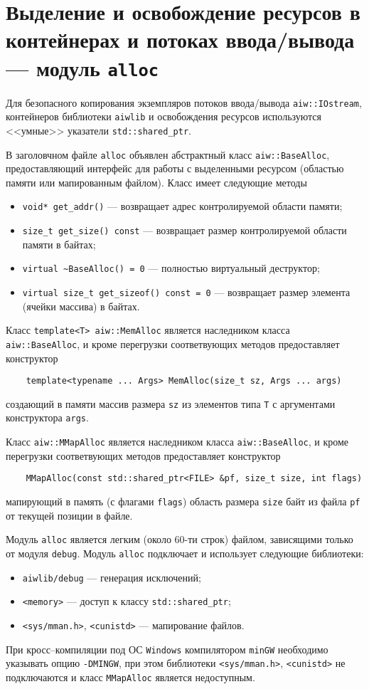 \section{Выделение и освобождение ресурсов  в контейнерах и потоках ввода/вывода --- модуль {\tt alloc}}
Для безопасного копирования экземпляров потоков ввода/вывода \verb'aiw::IOstream', контейнеров библиотеки
\verb'aiwlib' и освобождения ресурсов используются <<умные>> указатели \verb'std::shared_ptr'.

В заголовчном файле \verb'alloc' объявлен абстрактный класс \verb'aiw::BaseAlloc',
предоставляющий интерфейс для работы с выделенными ресурсом (областью памяти или мапированным файлом).
Класс имеет следующие методы
\begin{itemize}
\item \verb'void* get_addr()' --- возвращает адрес контролируемой области памяти;
\item \verb'size_t get_size() const'  --- возвращает размер контролируемой области памяти в байтах;
\item \verb'virtual ~BaseAlloc() = 0' --- полностью виртуальный деструктор;
\item \verb'virtual size_t get_sizeof() const = 0' --- возвращает размер элемента (ячейки массива) в байтах.
\end{itemize}

Класс \verb'template<T> aiw::MemAlloc' является наследником класса \verb'aiw::BaseAlloc',
и кроме перегрузки соответвующих методов предоставляет конструктор
\begin{verbatim}
    template<typename ... Args> MemAlloc(size_t sz, Args ... args)
\end{verbatim}
создающий в памяти массив размера \verb'sz' из элементов типа \verb'T' с аргументами конструктора \verb'args'.

Класс \verb'aiw::MMapAlloc' является наследником класса \verb'aiw::BaseAlloc',
и кроме перегрузки соответвующих методов предоставляет конструктор
\begin{verbatim}
    MMapAlloc(const std::shared_ptr<FILE> &pf, size_t size, int flags)
\end{verbatim}
мапирующий в память (с флагами \verb'flags') область размера \verb'size' байт из файла \verb'pf' от текущей позиции в файле.

Модуль \verb'alloc' является легким (около 60-ти строк) файлом, зависящими только от модуля \verb'debug'.
Модуль \verb'alloc' подключает и использует следующие библиотеки:
\begin{itemize}
\item \verb'aiwlib/debug' --- генерация исключений;
\item \verb'<memory>' --- доступ к классу \verb'std::shared_ptr';
\item \verb'<sys/mman.h>', \verb'<cunistd>' --- мапирование файлов.  
\end{itemize}

При кросс--компиляции под ОС \verb'Windows' компилятором \verb'minGW' необходимо указывать опцию \verb'-DMINGW',
при этом библиотеки \verb'<sys/mman.h>', \verb'<cunistd>' не подключаются и
класс \verb'MMapAlloc' является недоступным.

